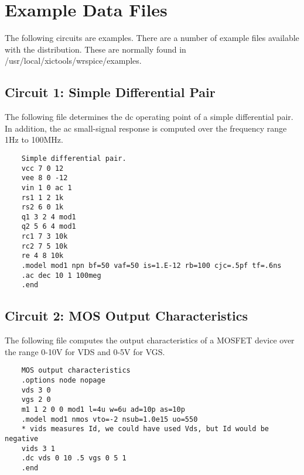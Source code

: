 
\section{Example Data Files}
\label{examples}


The following circuits are examples.  There are a number of example
files available with the {\WRspice} distribution.  These are normally
found in {\vt /usr/local/xictools/wrspice/examples}.

\subsection{Circuit 1:  Simple Differential Pair}


The following file determines the dc operating point of a simple
differential pair.  In addition, the ac small-signal response is
computed over the frequency range 1Hz to 100MHz.

\begin{verbatim}
    Simple differential pair.
    vcc 7 0 12
    vee 8 0 -12
    vin 1 0 ac 1
    rs1 1 2 1k
    rs2 6 0 1k
    q1 3 2 4 mod1
    q2 5 6 4 mod1
    rc1 7 3 10k
    rc2 7 5 10k
    re 4 8 10k
    .model mod1 npn bf=50 vaf=50 is=1.E-12 rb=100 cjc=.5pf tf=.6ns
    .ac dec 10 1 100meg
    .end
\end{verbatim}

\subsection{Circuit 2:  MOS Output Characteristics}


The following file computes the output characteristics of a MOSFET
device over the range 0-10V for VDS and 0-5V for VGS.

\begin{verbatim}
    MOS output characteristics
    .options node nopage
    vds 3 0
    vgs 2 0
    m1 1 2 0 0 mod1 l=4u w=6u ad=10p as=10p
    .model mod1 nmos vto=-2 nsub=1.0e15 uo=550
    * vids measures Id, we could have used Vds, but Id would be negative
    vids 3 1
    .dc vds 0 10 .5 vgs 0 5 1
    .end
\end{verbatim}

